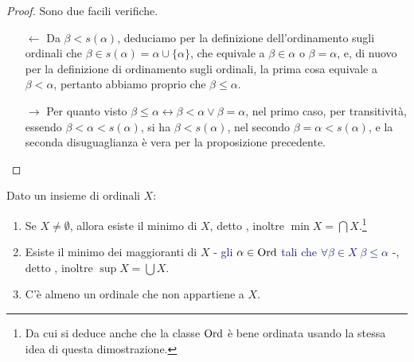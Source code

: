 \begin{proof}
	Sono due facili verifiche.
	\begin{itemize}
		\item[$\boxed{\longleftarrow}$] Da $\beta < s(\alpha)$, deduciamo per la definizione dell'ordinamento sugli ordinali che $\beta \in s(\alpha) = \alpha \cup \{\alpha\}$,
		che equivale a $\beta \in \alpha$ o $\beta = \alpha$, e, di nuovo per la definizione di ordinamento sugli ordinali, la prima cosa equivale a $\beta < \alpha$, pertanto abbiamo proprio che $\beta \leq \alpha$.
		\item[$\boxed{\longrightarrow}$] Per quanto visto $\beta \leq \alpha \leftrightarrow \beta < \alpha \lor \beta = \alpha$, nel primo caso, per transitività, essendo $\beta < \alpha < s(\alpha)$, si ha $\beta < s(\alpha)$, nel secondo $\beta = \alpha < s(\alpha)$,
		e la seconda disuguaglianza è vera per la proposizione precedente.
	\end{itemize}
\end{proof}

\begin{proposition}
	Dato un insieme di ordinali $X$:
	\begin{enumerate}[1.]
		\item Se $X \ne \emptyset$, allora esiste il minimo di $X$, detto , inoltre $\min X = \bigcap X$.\footnote{Da cui si deduce anche che la classe $\operatorname{Ord}$ è bene ordinata usando la stessa idea di questa dimostrazione.}
		\item Esiste il minimo dei maggioranti di $X$ \textcolor{MidnightBlue}{- gli $\alpha \in \operatorname{Ord}$ tali che $\forall \beta \in X \; \beta \leq \alpha$ -}, detto , inoltre $\sup X = \bigcup X$.
		\item C'è almeno un ordinale che non appartiene a $X$.
	\end{enumerate}
\end{proposition}


